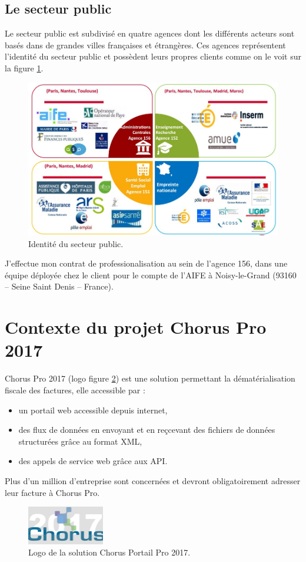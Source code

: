 \documentclass[12pt,a4paper]{article}
\begin{document}
\subsection{Le secteur public}
Le secteur public est subdivisé en quatre agences dont les différents acteurs sont basés dans de grandes villes françaises et étrangères. Ces agences représentent l'identité du secteur public et possèdent leurs propres clients comme on le voit sur la figure \ref{agences}.
\begin{figure}[H]
	\begin{center}
		\includegraphics[width=\textwidth,height=\textheight,keepaspectratio]{identiteSecteurPublic.png}
		\caption{Identité du secteur public.}
		\label{agences}
	\end{center}
\end{figure}
J’effectue mon contrat de professionalisation au sein de l'agence 156, dans une équipe déployée chez le client pour le compte de l’AIFE à Noisy-le-Grand (93160 – Seine Saint Denis – France).
\newpage
\clearpage
\section{Contexte du projet Chorus Pro 2017}
Chorus Pro 2017 (logo figure \ref{logoCpp}) est une solution  permettant la dématérialisation fiscale des factures, elle accessible par :
\begin{itemize}
\item un portail web accessible depuis internet,
\item des flux de données en envoyant et en reçcevant des fichiers de données structurées grâce au format \gls{XML},
\item des appels de service web grâce aux \gls{API}.
\end{itemize}
Plus d'un million d'entreprise sont concernées et devront obligatoirement adresser leur facture à Chorus Pro.
\begin{figure}[H]
	\begin{center}
		\includegraphics[width=0.3\textwidth, height=\textheight, keepaspectratio]{cpp2017.png}
		\caption{Logo de la solution Chorus Portail Pro 2017.}
		\label{logoCpp}
	\end{center}
\end{figure}
\end{document}
